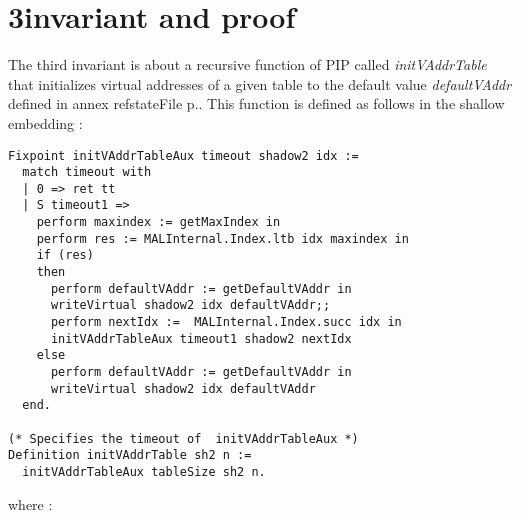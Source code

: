 \section{3\rd invariant and proof} \label{proof3}
The third invariant is about a recursive function of PIP called \textit{initVAddrTable} that initializes virtual addresses of a given table to the default value \textit{defaultVAddr} defined in annex ref{stateFile} p.\pageref{stateFile}. This function is defined as follows in the shallow embedding : 
\begin{lstlisting}[caption = {initVAddrTable in the shallow embedding}, xleftmargin=-.02\textwidth,
xrightmargin=-.02\textwidth,mathescape=true]
Fixpoint initVAddrTableAux timeout shadow2 idx :=
  match timeout with
  | 0 => ret tt
  | S timeout1 =>
    perform maxindex := getMaxIndex in
    perform res := MALInternal.Index.ltb idx maxindex in
    if (res)
    then
      perform defaultVAddr := getDefaultVAddr in
      writeVirtual shadow2 idx defaultVAddr;;
      perform nextIdx :=  MALInternal.Index.succ idx in
      initVAddrTableAux timeout1 shadow2 nextIdx
    else  
      perform defaultVAddr := getDefaultVAddr in
      writeVirtual shadow2 idx defaultVAddr
  end.

(* Specifies the timeout of  initVAddrTableAux *) 
Definition initVAddrTable sh2 n :=
  initVAddrTableAux tableSize sh2 n.
\end{lstlisting} \vspace{4pt}
where :
